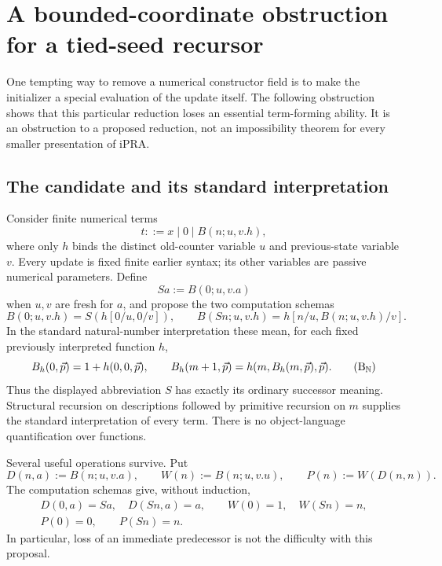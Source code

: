 \section{A bounded-coordinate obstruction for a tied-seed recursor}
\label{sec:binary-recursor-obstruction}

One tempting way to remove a numerical constructor field is to make the
initializer a special evaluation of the update itself.  The following
obstruction shows that this particular reduction loses an essential
term-forming ability.  It is an obstruction to a proposed reduction, not
an impossibility theorem for every smaller presentation of iPRA.

\subsection{The candidate and its standard interpretation}

Consider finite numerical terms
\[
 t::=x\mid 0\mid B(n;u,v.h),
\]
where only $h$ binds the distinct old-counter variable $u$ and previous-state
variable $v$.  Every update is fixed finite earlier syntax; its other
variables are passive numerical parameters.  Define
\[
 Sa:=B(0;u,v.a)
\]
when $u,v$ are fresh for $a$, and propose the two computation schemas
\[
 B(0;u,v.h)=S(h[0/u,0/v]),\qquad
 B(Sn;u,v.h)=h[n/u,B(n;u,v.h)/v].
 \tag{B}\label{eq:tied-seed-B}
\]
In the standard natural-number interpretation these mean, for each fixed
previously interpreted function $h$,
\[
 B_h(0,\vec p)=1+h(0,0,\vec p),\qquad
 B_h(m+1,\vec p)=h(m,B_h(m,\vec p),\vec p).
 \tag{B$_{\mathbb N}$}\label{eq:tied-seed-standard}
\]
Thus the displayed abbreviation $S$ has exactly its ordinary successor
meaning.  Structural recursion on descriptions followed by primitive
recursion on $m$ supplies the standard interpretation of every term.
There is no object-language quantification over functions.

Several useful operations survive.  Put
\[
 D(n,a):=B(n;u,v.a),\qquad W(n):=B(n;u,v.u),\qquad
 P(n):=W(D(n,n)).
\]
The computation schemas give, without induction,
\[
\begin{gathered}
 D(0,a)=Sa,\quad D(Sn,a)=a,\qquad
 W(0)=1,\quad W(Sn)=n,\\
 P(0)=0,\qquad P(Sn)=n.
\end{gathered}
\]
In particular, loss of an immediate predecessor is not the difficulty
with this proposal.

